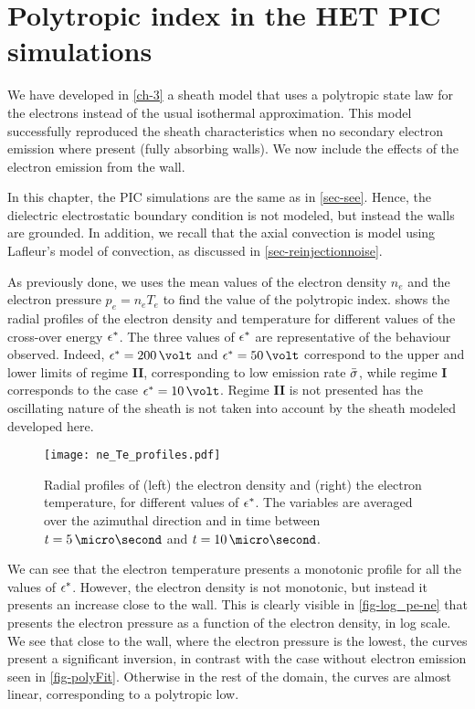 

\section{Polytropic index in the \ac{HET} \ac{PIC} simulations}
\label{sec-PIC_poly}

We have developed in \cref{ch-3} a sheath model that uses a polytropic state law for the electrons instead of the usual isothermal approximation.
This model successfully reproduced the sheath characteristics  when no secondary electron emission where present (fully absorbing walls).
We now include the effects of the electron emission from the wall.

In this chapter, the \ac{PIC} simulations are the same as in \cref{sec-see}. 
Hence, the dielectric electrostatic boundary condition is not modeled, but instead the walls are grounded.
In addition, we recall that the axial convection is model using Lafleur's model of convection, as discussed in \cref{sec-reinjectionnoise}.

As previously done, we uses the mean values of the electron density $n_e$ and the electron pressure $ p_e = n_e T_e$ to find the value of the polytropic index.
 shows the radial profiles of the electron density and temperature for different values of the cross-over energy $\epsilon^{*}$.
The three values of $\epsilon^{*}$ are representative of the behaviour observed.
Indeed, $\crover=200\,\volt$ and $\crover=50\,\volt$ correspond to the upper and lower limits of regime {\bf II}, corresponding to low emission rate $ \bar{\sigma }$, while regime {\bf I} corresponds to the case $\crover=10\,\volt$.
Regime {\bf II} is not presented has the oscillating nature of the sheath is not taken into account by the sheath modeled developed here. 


\begin{figure}[hbtp]
  \centering
  \texttt{[image: ne\_Te\_profiles.pdf]}
  \caption{Radial profiles of (left) the electron density and (right) the electron temperature, for different values of $\epsilon^{*}$. The variables are averaged over the azimuthal direction and in time between $t=5\,\micro\second$ and $t=10\,\micro\second$.  }
  \label{fig-radial_profiles_see}
\end{figure}

We can see that the electron temperature presents a monotonic profile for all the values of $\epsilon^{*}$.
However, the electron density is not monotonic, but instead it presents an increase close to the wall.
This is clearly visible in \cref{fig-log_pe-ne} that presents the electron pressure as a function of the electron density, in log scale.
We see that close to the wall, where the electron pressure is the lowest, the curves present a significant inversion, in contrast with the case without electron emission seen in \cref{fig-polyFit}.
Otherwise in the rest of the domain, the curves are almost linear, corresponding to a polytropic low.

